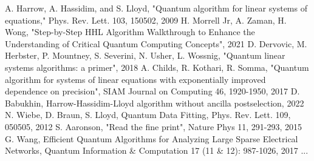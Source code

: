 
\begin{thebibliography}{00}
 A. Harrow, A. Hassidim, and S. Lloyd, "Quantum algorithm for linear systems of equations," Phys. Rev. Lett. 103, 150502, 2009
 H. Morrell Jr, A. Zaman, H. Wong, "Step-by-Step HHL Algorithm Walkthrough to Enhance the Understanding of Critical Quantum Computing Concepts", 2021
 D. Dervovic, M. Herbster, P. Mountney, S. Severini, N. Usher, L. Wossnig, "Quantum linear systems algorithms: a primer", 2018
 A. Childs, R. Kothari, R. Somma, "Quantum algorithm for systems of linear equations with exponentially improved dependence on precision", SIAM Journal on Computing 46, 1920-1950, 2017
 D. Babukhin, Harrow-Hassidim-Lloyd algorithm without ancilla postselection, 2022
 N. Wiebe, D. Braun, S. Lloyd, Quantum Data Fitting, Phys. Rev. Lett. 109, 050505, 2012
 S. Aaronson, "Read the fine print",  Nature Phys 11, 291-293, 2015 
 G. Wang, Efficient Quantum Algorithms for Analyzing Large Sparse Electrical Networks, Quantum Information \& Computation 17 (11 \& 12): 987-1026, 2017 
 ...

\end{thebibliography}



\begin{comment}
    HHL-2009: 
    step by step: 
    primer: https://arxiv.org/abs/1802.08227
    exponential imprved dependencs on precision: https://arxiv.org/abs/1511.02306
    without ancilla: https://arxiv.org/abs/2208.02200
    data fitting:
    fineprint: https://inspirehep.net/literature/1834407
    large electrical networks: https://arxiv.org/abs/1311.1851
    qiskit example: https://learn.qiskit.org/course/ch-applications/solving-linear-systems-of-equations-using-hhl-and-its-qiskit-implementation#example1
\end{comment}
